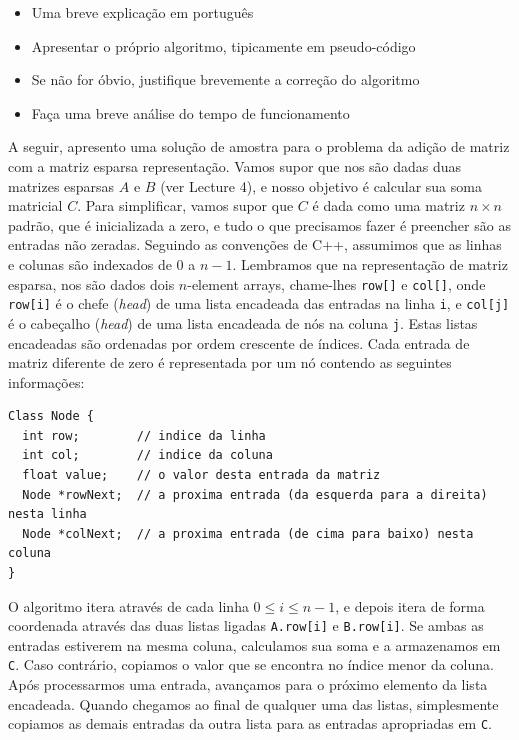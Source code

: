 \documentclass{article}
\begin{document}
\begin{itemize}[noitemsep]
  \item Uma breve explicação em português
  \item Apresentar o próprio algoritmo, tipicamente em pseudo-código
  \item Se não for óbvio, justifique brevemente a correção do algoritmo
  \item Faça uma breve análise do tempo de funcionamento
\end{itemize}

A seguir, apresento uma solução de amostra para o problema da adição de matriz com a matriz esparsa representação. Vamos supor que nos são dadas duas matrizes esparsas $A$ e $B$ (ver Lecture 4), e nosso objetivo é calcular sua soma matricial $C$. Para simplificar, vamos supor que $C$ é dada como uma matriz $n \times n$ padrão, que é inicializada a zero, e tudo o que precisamos fazer é preencher são as entradas não zeradas. Seguindo as convenções de C++, assumimos que as linhas e colunas são indexados de $0$ a $n-1$. Lembramos que na representação de matriz esparsa, nos são dados dois $n$-element arrays, chame-lhes \texttt{row[]} e \texttt{col[]}, onde \texttt{row[i]} é o chefe (\emph{head}) de uma lista encadeada das entradas na linha \texttt{i}, e \texttt{col[j]} é o cabeçalho (\emph{head}) de uma lista encadeada de nós na coluna \texttt{j}. Estas listas encadeadas são ordenadas por ordem crescente de índices. Cada entrada de matriz diferente de zero é representada por um nó contendo as seguintes informações:

\begin{lstlisting}
Class Node {
  int row;        // indice da linha
  int col;        // indice da coluna
  float value;    // o valor desta entrada da matriz
  Node *rowNext;  // a proxima entrada (da esquerda para a direita) nesta linha
  Node *colNext;  // a proxima entrada (de cima para baixo) nesta coluna
}
\end{lstlisting}


O algoritmo itera através de cada linha $0 \leq i \leq n - 1$, e depois itera de forma coordenada através das duas listas ligadas \texttt{A.row[i]} e \texttt{B.row[i]}. Se ambas as entradas estiverem na mesma coluna, calculamos sua soma e a armazenamos em \texttt{C}. Caso contrário, copiamos o valor que se encontra no índice menor da coluna. Após processarmos uma entrada, avançamos para o próximo elemento da lista encadeada. Quando chegamos ao final de qualquer uma das listas, simplesmente copiamos as demais entradas da outra lista para as entradas apropriadas em \texttt{C}.
\end{document}
